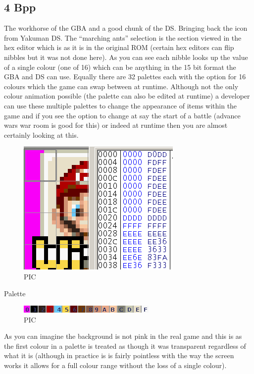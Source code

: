 \documentclass[
]{book}
\begin{document}
\hypertarget{bpp-1}{%
\subsection{4 Bpp}\label{bpp-1}}

The workhorse of the GBA and a good chunk of the DS. Bringing back the icon from Yakuman DS. The ``marching ants'' selection is the section viewed in the hex editor which is as it is in the original ROM (certain hex editors can flip nibbles but it was not done here). As you can see each nibble looks up the value of a single colour (one of 16) which can be anything in the 15 bit format the GBA and DS can use. Equally there are 32 palettes each with the option for 16 colours which the game can swap between at runtime. Although not the only colour animation possible (the palette can also be edited at runtime) a developer can use these multiple palettes to change the appearance of items within the game and if you see the option to change at say the start of a battle (advance wars war room is good for this) or indeed at runtime then you are almost certainly looking at this.

\begin{figure}
\centering
\includegraphics{images/0_home_fast6191_romhackingguide_unrenamed_files_and_original_borders_romhackingendiandemo.png}
\caption{PIC}
\end{figure}

Palette

\begin{figure}
\centering
\includegraphics{images/21_home_fast6191_romhackingguide_unrenamed_file___inal_borders_romhackingguide4bpppalettedemo.png}
\caption{PIC}
\end{figure}

As you can imagine the background is not pink in the real game and this is as the first colour in a palette is treated as though it was transparent regardless of what it is (although in practice is is fairly pointless with the way the screen works it allows for a full colour range without the loss of a single colour).
\end{document}
